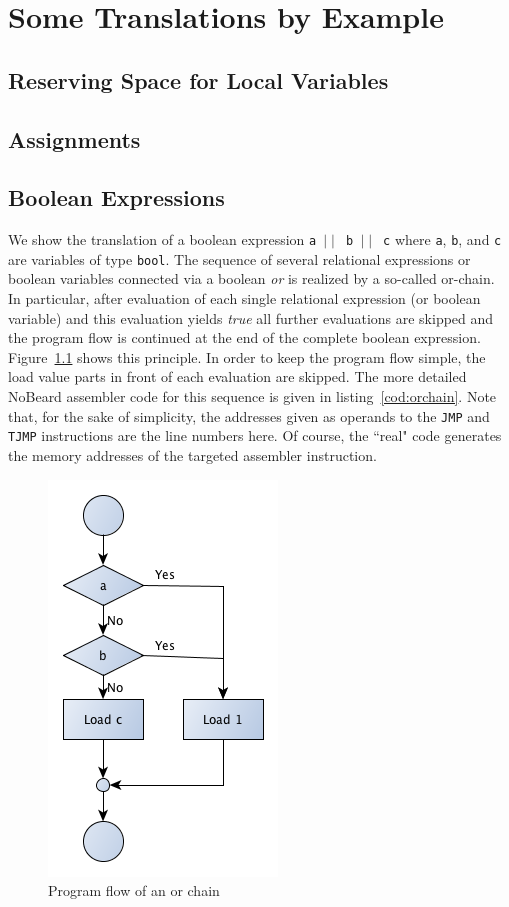 \documentclass[11pt]{report}
\newcommand{\leongage}{NoBeard}
\begin{document}
\chapter{Some Translations by Example}
\section{Reserving Space for Local Variables}

\section{Assignments}

\section{Boolean Expressions}
We show the translation of a boolean expression {\tt a $\mid \mid$ b $\mid \mid$ c} where {\tt a}, {\tt b}, and {\tt c} are variables of type {\tt bool}. The sequence of several relational expressions or boolean variables connected via a boolean {\em or} is realized by a so-called or-chain. In particular, after evaluation of each single relational expression (or boolean variable) and this evaluation yields {\em true} all further evaluations are skipped and the program flow is continued at the end of the complete boolean expression. Figure~\ref{fig:orchain} shows this principle. In order to keep the program flow simple, the load value parts in front of each evaluation are skipped. The more detailed \leongage{} assembler code for this sequence is given in listing~\ref{cod:orchain}. Note that, for the sake of simplicity, the addresses given as operands to the {\tt JMP} and {\tt TJMP} instructions are the line numbers here. Of course, the ``real" code generates the memory addresses of the targeted assembler instruction.

\begin{figure}
\begin{center}
\includegraphics[scale=.5]{images/OrChain.png}
\end{center}
\caption{Program flow of an or chain}
\label{fig:orchain}
\end{figure}
\end{document}
